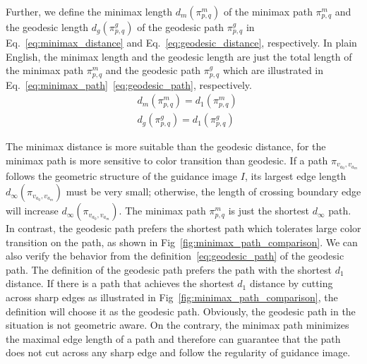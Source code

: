 \documentclass[preprint,10pt,5p,times,twocolumn]{elsarticle}
\begin{document}
Further, we define the minimax length $d_m({\pi^m_{{p},{q}}})$ of the minimax path ${\pi^m_{{p},{q}}}$ and the geodesic length $d_g({\pi^g_{{p},{q}}})$ of the geodesic path  ${\pi^g_{{p},{q}}} $ in Eq.~\eqref{eq:minimax_distance} and Eq.~\eqref{eq:geodesic_distance}, respectively. In plain English, the minimax length and the geodesic length  are just the total length of the minimax path $\pi^m_{{p},{q}}$ and the geodesic path $\pi^g_{{p},{q}}$ which are illustrated in Eq.~\eqref{eq:minimax_path}~\eqref{eq:geodesic_path}, respectively.
%
\begin{align}
& d_m({\pi^m_{{p},{q}}}) = d_1({\pi^m_{{p},{q}}}) \label{eq:minimax_distance} \\
& d_g({\pi^g_{{p},{q}}}) = d_1({\pi^g_{{p},{q}}}) \label{eq:geodesic_distance}
\end{align}




The minimax distance is more suitable than the geodesic distance, for the minimax path is more sensitive to color transition than geodesic. If a path $\pi_{v_{{a_0}}, v_{{a_m}}} $ follows the geometric structure of the guidance image $I$, its largest edge length ${d_\infty}(\pi_{v_{{a_0}}, v_{{a_m}}})$ must be very small; otherwise, the length of crossing boundary edge will increase ${d_\infty}(\pi_{v_{{a_0}}, v_{{a_m}}})$. The minimax path $\pi^m_{p,q}$ is just the shortest ${d_\infty}$ path. In contrast, the geodesic path prefers the shortest path which tolerates large color transition on the path, as shown in Fig~\ref{fig:minimax_path_comparison}. We can also verify the behavior  from the definition~\eqref{eq:geodesic_path} of the geodesic path. The definition of the geodesic path prefers the path with the shortest $d_1$ distance. If there is a path that achieves the shortest $d_1$ distance by cutting across sharp edges as illustrated in Fig~\ref{fig:minimax_path_comparison}, the definition will choose it as the geodesic path. Obviously, the geodesic path in the situation is not geometric aware. On the contrary, the minimax path minimizes the maximal edge length of a path and therefore can guarantee that the path does not cut across any sharp edge and follow the regularity of guidance image.
\end{document}
